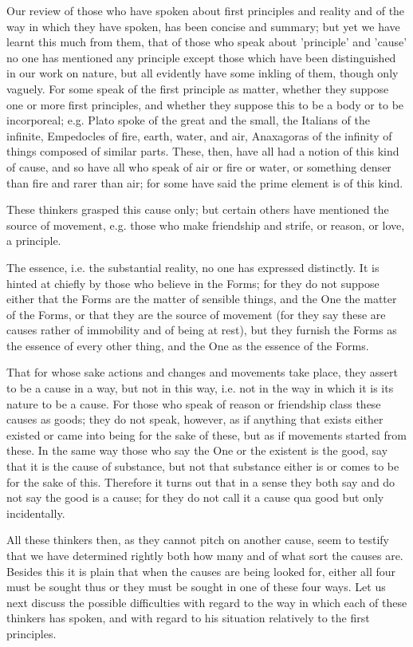 \documentclass{article}
\begin{document}
Our review of those who have spoken about first principles and reality and of the way in which they have spoken, has been concise and summary; but yet we have learnt this much from them, that of those who speak about 'principle' and 'cause' no one has mentioned any principle except those which have been distinguished in our work on nature, but all evidently have some inkling of them, though only vaguely. For some speak of the first principle as matter, whether they suppose one or more first principles, and whether they suppose this to be a body or to be incorporeal; e.g. Plato spoke of the great and the small, the Italians of the infinite, Empedocles of fire, earth, water, and air, Anaxagoras of the infinity of things composed of similar parts. These, then, have all had a notion of this kind of cause, and so have all who speak of air or fire or water, or something denser than fire and rarer than air; for some have said the prime element is of this kind.

These thinkers grasped this cause only; but certain others have mentioned the source of movement, e.g. those who make friendship and strife, or reason, or love, a principle.

The essence, i.e. the substantial reality, no one has expressed distinctly. It is hinted at chiefly by those who believe in the Forms; for they do not suppose either that the Forms are the matter of sensible things, and the One the matter of the Forms, or that they are the source of movement (for they say these are causes rather of immobility and of being at rest), but they furnish the Forms as the essence of every other thing, and the One as the essence of the Forms.

That for whose sake actions and changes and movements take place, they assert to be a cause in a way, but not in this way, i.e. not in the way in which it is its nature to be a cause. For those who speak of reason or friendship class these causes as goods; they do not speak, however, as if anything that exists either existed or came into being for the sake of these, but as if movements started from these. In the same way those who say the One or the existent is the good, say that it is the cause of substance, but not that substance either is or comes to be for the sake of this. Therefore it turns out that in a sense they both say and do not say the good is a cause; for they do not call it a cause qua good but only incidentally.

All these thinkers then, as they cannot pitch on another cause, seem to testify that we have determined rightly both how many and of what sort the causes are. Besides this it is plain that when the causes are being looked for, either all four must be sought thus or they must be sought in one of these four ways. Let us next discuss the possible difficulties with regard to the way in which each of these thinkers has spoken, and with regard to his situation relatively to the first principles.
\end{document}
